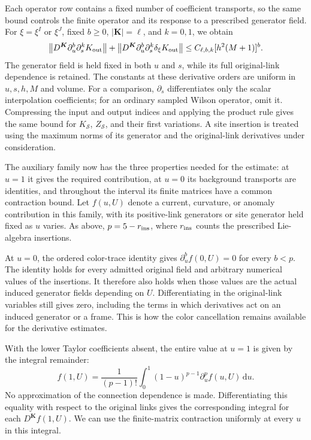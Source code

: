 \documentclass[11pt,a4paper]{article}
\theoremstyle{remark}
\newcommand{\dd}{\mathrm d}
\begin{document}
Each operator row contains a fixed number of coefficient transports, so the
same bound controls the finite operator and its response to a prescribed
generator field. For $\xi=\xi^I$ or $\xi^J$, fixed $b\ge0$,
$|\boldsymbol K|=\ell$, and $k=0,1$, we obtain
\begin{equation}
 \bigl\|D^{\boldsymbol K}\partial_u^b\partial_s^k
                  K_{\rm out}\bigr\|
 +\bigl\|D^{\boldsymbol K}\partial_u^b\partial_s^k
                  \delta_\xi K_{\rm out}\bigr\|
       \le C_{\ell,b,k}[h^2(M+1)]^b.
\end{equation}
The generator field is held fixed in both $u$ and $s$, while its full
original-link dependence is retained. The constants at these derivative
orders are uniform in $u,s,h,M$ and volume. For a comparison,
$\partial_s$ differentiates only the scalar interpolation coefficients;
for an ordinary sampled Wilson operator, omit it. Compressing the input
and output indices and applying the product rule gives the same bound
for $K_{\mathcal S}$, $Z_{\mathcal S}$, and their first
variations. A site insertion is treated using the maximum norms of its
generator and the original-link derivatives under consideration.

The auxiliary family now has the three properties needed for the
estimate: at $u=1$ it gives the required contribution, at $u=0$
its background transports are identities, and throughout the interval
its finite matrices have a common contraction bound. Let $f(u,U)$
denote a current, curvature, or anomaly contribution in this family,
with its positive-link generators or site generator held fixed as $u$
varies. As above, $p=5-r_{\rm ins}$, where $r_{\rm ins}$ counts
the prescribed Lie-algebra insertions.

At $u=0$, the ordered color-trace identity gives
$\partial_u^bf(0,U)=0$ for every $b<p$. The identity holds for
every admitted original field and arbitrary numerical values of the
insertions. It therefore also holds when those values are the actual
induced generator fields depending on $U$. Differentiating in the original-link
variables still gives zero, including the terms in which derivatives
act on an induced generator or a frame. This is how the color cancellation remains
available for the derivative estimates.

With the lower Taylor coefficients absent, the entire value at $u=1$
is given by the integral remainder:
\begin{equation}
 f(1,U)=\frac1{(p-1)!}\int_0^1(1-u)^{p-1}
                       \partial_u^p f(u,U)\,\dd u.
 \label{app:a:remainder}
\end{equation}
No approximation of the connection dependence is made. Differentiating
this equality with respect to the original links gives the corresponding
integral for each $D^{\boldsymbol K}f(1,U)$. We can use the
finite-matrix contraction uniformly at every $u$ in this integral.
\end{document}
